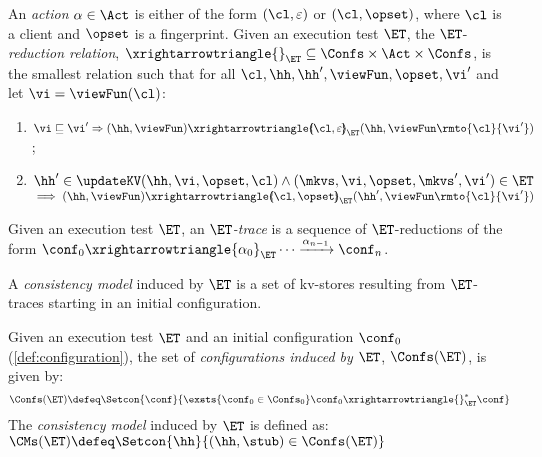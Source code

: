 \begin{definition}[$\ET$-trace]
\label{def:reduction}
An \emph{action} $\alpha \in \Act$ is either of the form $(\cl, \varepsilon)$ or $(\cl, \opset)$, 
where $\cl$ is a client and $\opset$ is a fingerprint. 
Given an execution test $\ET$, the $\ET$-\emph{reduction relation},
$\xrightarrowtriangle{}_{\ET} \subseteq \Confs \times \Act \times \Confs$, 
is the smallest relation such that for all $\cl, \hh, \hh', \viewFun, \opset, \vi'$ and let \( \vi = \viewFun(\cl) \):
\begin{enumerate}
	\item
    $\vi \sqsubseteq \vi'
    \Rightarrow
    (\hh, \viewFun) \xrightarrowtriangle{\hspace{-5pt}(\cl, \varepsilon)\hspace{-5pt}}_{\ET} 
    (\hh, \viewFun\rmto{\cl}{\vi'})$; 
	\item 
    $\hh' \in \updateKV(\hh, \vi , \opset, \cl)
     \wedge (\mkvs, \vi, \opset, \mkvs', \vi') \in \ET
	$  \\
	\phantom{a} \hfill $\implies (\hh, \viewFun) \xrightarrowtriangle{\hspace{-5pt}(\cl, \opset)\hspace{-5pt}}_{\ET} (\hh', \viewFun\rmto{\cl}{\vi'})$
\end{enumerate}
Given an execution test $\ET$, an \emph{$\ET$-trace} is a sequence of $\ET$-reductions of the form $\conf_{0} \xrightarrowtriangle{\alpha_{0}}_{\ET} \cdots 
\xrightarrow{\alpha_{n-1}} \conf_{n}$.
\end{definition}




A \emph{consistency model} induced by $\ET$ is a set of kv-stores
resulting from $\ET$-traces starting in an 
initial configuration. 

\begin{definition}
\label{def:cm}
Given an execution test $\ET$ and an initial configuration $\conf_0$ (\cref{def:configuration}),
the set of \emph{configurations induced by $\ET$},  $\Confs(\ET)$, is   given by: 
\[
\Confs(\ET)\defeq 
\Setcon{ \conf}{ 
	\exsts{\conf_0 \in \Confs_0}
	\conf_0 \xrightarrowtriangle{}_{\ET}^{*} \conf
}
\]
The \emph{consistency model} induced by $\ET$ is defined as:
\( 
\CMs(\ET) \defeq \Setcon{ \hh }{ (\hh, \stub) \in \Confs(\ET) }
\)
\end{definition}


